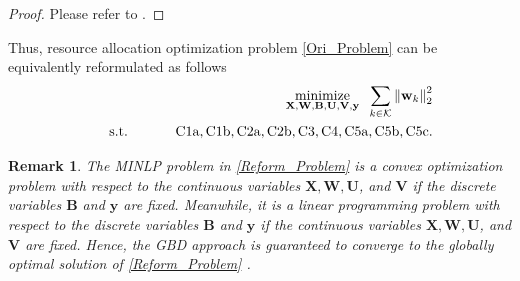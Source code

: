\documentclass[12pt, draftclsnofoot, onecolumn]{IEEEtran}
\makeatletter
\newcommand*{\rom}[1]{\expandafter\@slowromancap\romannumeral #1@}
\DeclareMathOperator{\mino}{minimize}
\newtheorem{remark}{Remark}
\makeatother
\begin{document}
\vspace*{-2mm}
\begin{proof}
Please refer to \cite[Section \rom{3}]{luo2006introduction}.
\end{proof}
Thus, resource allocation optimization problem \eqref{Ori_Problem} can be equivalently reformulated as follows 
\begin{eqnarray}
\label{Reform_Problem}
    &&\hspace*{-4mm}\underset{\mathbf{X},\mathbf{W},\mathbf{B},\mathbf{U},\mathbf{V},\mathbf{y}}{\mino}\hspace*{2mm}\sum_{k\in\mathcal{K}}\left\|\mathbf{w}_k\right\|_2^2\\
    &&\hspace*{2mm}\mbox{s.t.}\hspace*{12mm} \mbox{C1a},\mbox{C1b}, \mbox{C2a},{\mbox{C2b}},\mbox{C3},\mbox{C4},\mbox{C5a},\mbox{C5b},\mbox{C5c}\notag.
\end{eqnarray}
\begin{remark}
The MINLP problem in \eqref{Reform_Problem} is a convex optimization problem with respect to the continuous variables $\mathbf{X},\mathbf{W},\mathbf{U}$, and $\mathbf{V}$ if the discrete variables $\mathbf{B}$ and $\mathbf{y}$ are fixed. Meanwhile, it is a linear programming problem with respect to the discrete variables $\mathbf{B}$ and $\mathbf{y}$ if the continuous variables $\mathbf{X},\mathbf{W},\mathbf{U}$, and $\mathbf{V}$ are fixed. Hence, the GBD approach is guaranteed to converge to the globally optimal solution of \eqref{Reform_Problem} \cite{geoffrion1972generalized}.
\end{remark}
\end{document}
